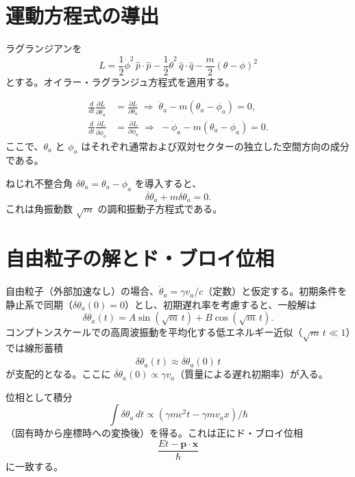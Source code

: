 \documentclass[11pt,a4paper]{article}
\begin{document}
\section{運動方程式の導出}

ラグランジアンを
\begin{equation}
L = \frac{1}{2} \dot{\phi}^2 \, \hat{p}\cdot\hat{p}
- \frac{1}{2} \dot{\theta}^2 \, \hat{q}\cdot\hat{q}
- \frac{m}{2} (\theta - \phi)^2
\end{equation}
とする。オイラー・ラグランジュ方程式を適用する。

\begin{align}
\frac{d}{dt}\frac{\partial L}{\partial \dot{\theta}_a} &= \frac{\partial L}{\partial \theta_a}
\;\Rightarrow\; \ddot{\theta}_a - m (\theta_a - \phi_a) = 0,\\[6pt]
\frac{d}{dt}\frac{\partial L}{\partial \dot{\phi}_a} &= \frac{\partial L}{\partial \phi_a}
\;\Rightarrow\; -\ddot{\phi}_a - m (\theta_a - \phi_a) = 0.
\end{align}
ここで、$\theta_a$ と $\phi_a$ はそれぞれ通常および双対セクターの独立した空間方向の成分である。

ねじれ不整合角 $\delta\theta_a = \theta_a - \phi_a$ を導入すると、
\begin{equation}
\ddot{\delta\theta}_a + m \delta\theta_a = 0.
\end{equation}
これは角振動数 $\sqrt{m}$ の調和振動子方程式である。

\section{自由粒子の解とド・ブロイ位相}

自由粒子（外部加速なし）の場合、$\dot{\theta}_a = \gamma v_a/c$（定数）と仮定する。初期条件を静止系で同期（$\delta\theta_a(0)=0$）とし、初期遅れ率を考慮すると、一般解は
\begin{equation}
\delta\theta_a(t) = A \sin(\sqrt{m}\, t) + B \cos(\sqrt{m}\, t).
\end{equation}
コンプトンスケールでの高周波振動を平均化する低エネルギー近似（$\sqrt{m}\, t \ll 1$）では線形蓄積
\[
\delta\theta_a(t) \approx \dot{\delta\theta}_a(0)\, t
\]
が支配的となる。ここに $\dot{\delta\theta}_a(0) \propto \gamma v_a$（質量による遅れ初期率）が入る。

位相として積分
\[
\int \delta\theta_a\, dt \propto (\gamma m c^2 t - \gamma m v_a x)/\hbar
\]
（固有時から座標時への変換後）を得る。これは正にド・ブロイ位相
\[
\frac{E t - \mathbf{p}\cdot\mathbf{x}}{\hbar}
\]
に一致する。
\end{document}
